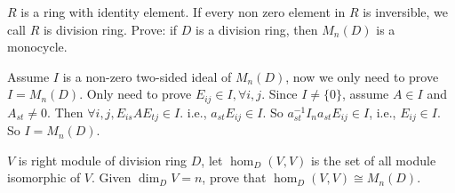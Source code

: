\documentclass{ctexart}
\newif\ifpreface
\begin{document}
\large
\setlength{\baselineskip}{1.2em}
\ifpreface
    
\newgeometry{left=2cm,right=2cm,top=2cm,bottom=2cm}
\else
{}
\maketitle
\fi
\begin{problem}
  \(R\) is a ring with identity element.
  If every non zero element in \(R\) is inversible, we call \(R\) is division ring.
  Prove: if \( D\) is a division ring, then \(M_n(D)\) is a monocycle.
\end{problem}
\begin{solution}
  Assume \(I\) is a non-zero two-sided ideal of \(M_n(D)\), now we only need to prove \(I=M_n(D)\). 
  Only need to prove \(E_{ij} \in I,\forall i,j\). 
  Since \(I \neq \{0\}\), assume \(A \in I\) and \(A_{st} \neq 0\). 
  Then \(\forall i,j,E_{is}AE_{tj} \in I\). i.e., \(a_{st} E_{ij} \in I\). 
  So \(a_{st}^{-1}I_n a_{st}E_{ij} \in I\), i.e., \(E_{ij} \in I\). 
  So \(I = M_n(D)\). 
\end{solution}

\begin{problem}
  \(V\) is right module of division ring \(D\), let \(\hom_D(V,V)\) is the set of all module isomorphic of \(V\). 
  Given \(\dim_DV=n\), prove that \(\hom_D(V,V) \cong M_n(D)\). 
\end{problem}
\end{document}
